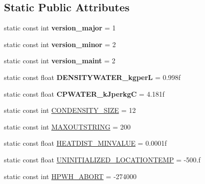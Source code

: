 \subsection*{Static Public Attributes}
\begin{DoxyCompactItemize}
\item 
\hypertarget{class_h_p_w_h_a404694da361f91cab76c434bc2e8aba7}{static const int {\bfseries version\-\_\-major} = 1}\label{class_h_p_w_h_a404694da361f91cab76c434bc2e8aba7}

\item 
\hypertarget{class_h_p_w_h_a4d21de98801ba96190a10fce9f7e0007}{static const int {\bfseries version\-\_\-minor} = 2}\label{class_h_p_w_h_a4d21de98801ba96190a10fce9f7e0007}

\item 
\hypertarget{class_h_p_w_h_af02ab978efb608dbcb3010f51fec5bee}{static const int {\bfseries version\-\_\-maint} = 2}\label{class_h_p_w_h_af02ab978efb608dbcb3010f51fec5bee}

\item 
\hypertarget{class_h_p_w_h_ad731cfda8428fb584d308f98c2eb329a}{static const float {\bfseries D\-E\-N\-S\-I\-T\-Y\-W\-A\-T\-E\-R\-\_\-kgper\-L} = 0.\-998f}\label{class_h_p_w_h_ad731cfda8428fb584d308f98c2eb329a}

\item 
\hypertarget{class_h_p_w_h_abf1c9972b0dc6bfe5ec90042d03db7f4}{static const float {\bfseries C\-P\-W\-A\-T\-E\-R\-\_\-k\-Jperkg\-C} = 4.\-181f}\label{class_h_p_w_h_abf1c9972b0dc6bfe5ec90042d03db7f4}

\item 
static const int \hyperlink{class_h_p_w_h_a545073febf9422e346d62d27093b8eb8}{C\-O\-N\-D\-E\-N\-S\-I\-T\-Y\-\_\-\-S\-I\-Z\-E} = 12
\item 
static const int \hyperlink{class_h_p_w_h_aee834cec1de7483ecf642d310a7da75f}{M\-A\-X\-O\-U\-T\-S\-T\-R\-I\-N\-G} = 200
\item 
static const float \hyperlink{class_h_p_w_h_a17bd9d54d4aa54393078e4be104675dd}{H\-E\-A\-T\-D\-I\-S\-T\-\_\-\-M\-I\-N\-V\-A\-L\-U\-E} = 0.\-0001f
\item 
static const float \hyperlink{class_h_p_w_h_aaa8fb3333f8cb5caf7ef0c92d3d8f998}{U\-N\-I\-N\-I\-T\-I\-A\-L\-I\-Z\-E\-D\-\_\-\-L\-O\-C\-A\-T\-I\-O\-N\-T\-E\-M\-P} = -\/500.f
\item 
static const int \hyperlink{class_h_p_w_h_a727a9e272cf7ac3564ebd67bfb8ed063}{H\-P\-W\-H\-\_\-\-A\-B\-O\-R\-T} = -\/274000
\end{DoxyCompactItemize}


